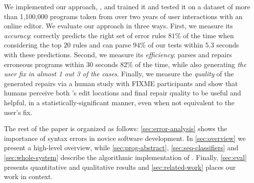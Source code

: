 We implemented our approach, \toolname, and trained it and tested it on a
dataset of more than 1,100,000 programs taken from over two years of user
interactions with an online editor. We evaluate our approach in three ways.
%
First, we measure its \emph{accuracy}: \toolname correctly predicts
the right set of error rules $81\%$ of the time when considering the top $20$
rules and can parse $94\%$ of our tests within $5.3$ seconds with these
predictions.
%
Second, we measure its \emph{efficiency}: \toolname
parses and repairs erroneous programs within $30$ seconds $82\%$ of the time,
while also generating \emph{the user fix in almost 1 out 3 of the cases}.
%
Finally, we measure the \emph{quality} of the generated repairs via a human study
with FIXME participants and show that humans perceive both \toolname's edit
locations and final repair quality to be useful and helpful,
in a statistically-significant manner, even when not equivalent to the user's fix.


The rest of the paper is organized as follows: \autoref{sec:error-analysis}
shows the importance of syntax errors in novice software
development. 
In \autoref{sec:overview} we present a high-level overview, while 
\autoref{sec:prog-abstract}, \autoref{sec:seq-classifiers} and
\autoref{sec:whole-system} describe the algorithmic implementation of 
\toolname. Finally, \autoref{sec:eval} presents quantitative and
qualitative results and \autoref{sec:related-work} places our work in 
context.
